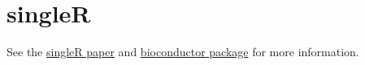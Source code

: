 \section{singleR}

See the \href{https://www.nature.com/articles/s41590-018-0276-y}{singleR paper} and \href{http://bioconductor.org/packages/release/bioc/html/SingleR.html}{bioconductor package} for more information.




\clearpage
